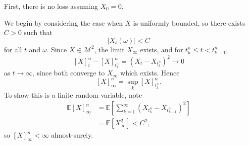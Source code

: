 \documentclass[12pt]{article}
\begin{document}
\begin{proofbox}
	First, there is no loss assuming $X_0 = 0$.

	We begin by considering the case when $X$ is uniformly bounded, so there exists $C > 0$ such that
	\[
	|X_t(\omega)| < C
	\]
	for all $t$ and $\omega$. Since $X \in \mathcal{M}^2$, the limit $X_\infty$ exists, and for $t_k^{n} \leq t < t_{k+1}^{n}$,
	\[
		[X]_t^{n} - [X]_{t_k^{n}}^n = (X_t - X_{t_k^{n}})^2 \to 0
	\]
	as $t \to \infty$, since both converge to $X_\infty$ which exists. Hence
	\[
		[X]_\infty^{n} = \sup_k [X]^{n}_{t_k^{n}}.
	\]
	To show this is a finite random variable, note
	\begin{align*}
		\mathbb{E} [X]_\infty^{n} &= \mathbb{E}\left[ \sum_{k = 1}^{\infty} (X_{t_k^{n}} - X_{t_{k-1}^{n}})^2 \right] \\
					  &=\mathbb{E}[X_\infty^2] < C^2,
	\end{align*}
	so $[X]_\infty^{n} < \infty$ almost-surely.


\end{proofbox}
\end{document}
